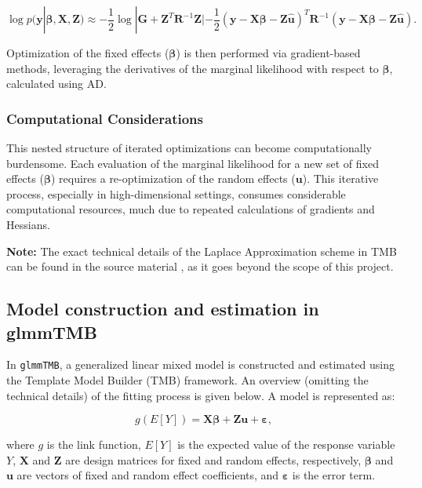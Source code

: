 \documentclass[12pt, twoside,hidelinks]{article}
\theoremstyle{definition}
\numberwithin{equation}{section}
\begin{document}
\begin{equation}
    \log p(\boldsymbol{y} | \boldsymbol{\beta}, \mathbf{X}, \mathbf{Z}) \approx -\frac{1}{2} \log |\mathbf{G} + \mathbf{Z}^T\mathbf{R}^{-1}\mathbf{Z}| - \frac{1}{2} (\boldsymbol{y} - \mathbf{X}\boldsymbol{\beta} - \mathbf{Z}\hat{\boldsymbol{u}})^T \mathbf{R}^{-1} (\boldsymbol{y} - \mathbf{X}\boldsymbol{\beta} - \mathbf{Z}\hat{\boldsymbol{u}}).
\end{equation}

Optimization of the fixed effects (\(\boldsymbol{\beta}\)) is then performed via gradient-based methods, leveraging the derivatives of the marginal likelihood with respect to \(\boldsymbol{\beta}\), calculated using AD.

\subsubsection{Computational Considerations}\label{sec:rpack:Laplace:computational}
This nested structure of iterated optimizations can become computationally burdensome. Each evaluation of the marginal likelihood for a new set of fixed effects (\(\boldsymbol{\beta}\)) requires a re-optimization of the random effects (\(\boldsymbol{u}\)). This iterative process, especially in high-dimensional settings, consumes considerable computational resources, much due to repeated calculations of gradients and Hessians.

\textbf{Note:} The exact technical details of the Laplace Approximation scheme in TMB can be found in the source material \citet{Kristensen2016TMB}, as it goes beyond the scope of this project. 

\subsection{Model construction and estimation in glmmTMB}\label{sec:rpack:construct}

In \texttt{glmmTMB}, a generalized linear mixed model is constructed and estimated using the Template Model Builder (TMB) framework. An overview (omitting the technical details) of the fitting process is given below. A model is represented as:

\begin{equation}
g(E[Y]) = \mathbf{X} \boldsymbol{\beta} + \mathbf{Z}\boldsymbol{u} + \boldsymbol{\varepsilon},
\label{eq:linkglmm}
\end{equation}

where \( g \) is the link function, \( E[Y] \) is the expected value of the response variable \( Y \), \( \mathbf{X} \) and \( \mathbf{Z} \) are design matrices for fixed and random effects, respectively, \( \boldsymbol{\beta} \) and \( \boldsymbol{u} \) are vectors of fixed and random effect coefficients, and \( \boldsymbol{\varepsilon} \) is the error term.
\end{document}
